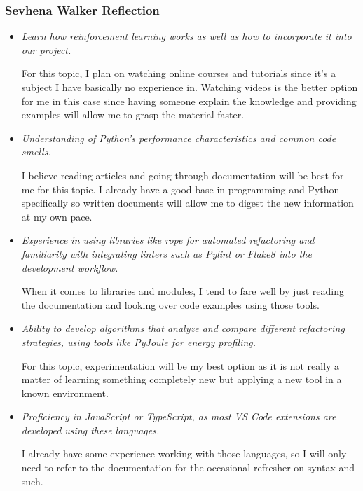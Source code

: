 \documentclass[12pt]{article}
\begin{document}
\subsubsection*{Sevhena Walker Reflection}
\medskip

\begin{itemize}[label={}, wide=0pt, leftmargin=*]

  \item \textit{Learn how reinforcement learning works as well as how to incorporate it into our project.}
  
  For this topic, I plan on watching online courses and tutorials since it's a subject I have basically no experience in. Watching videos is the better option for me in this case since having someone explain the knowledge and providing examples will allow me to grasp the material faster.
      
  \item \textit{Understanding of Python's performance characteristics and common code smells.}
  
  I believe reading articles and going through documentation will be best for me for this topic. I already have a good base in programming and Python specifically so written documents will allow me to digest the new information at my own pace.
      
  \item \textit{Experience in using libraries like rope for automated refactoring and familiarity with integrating linters such as Pylint or Flake8 into the development workflow.} 
  
  When it comes to libraries and modules, I tend to fare well by just reading the documentation and looking over code examples using those tools.
      
  \item \textit{Ability to develop algorithms that analyze and compare different refactoring strategies, using tools like PyJoule for energy profiling.}
  
  For this topic, experimentation will be my best option as it is not really a matter of learning something completely new but applying a new tool in a known environment. 

  \item \textit{Proficiency in JavaScript or TypeScript, as most VS Code extensions are developed using these languages.}

  I already have some experience working with those languages, so I will only need to refer to the documentation for the occasional refresher on syntax and such.

\end{itemize}
\end{document}

